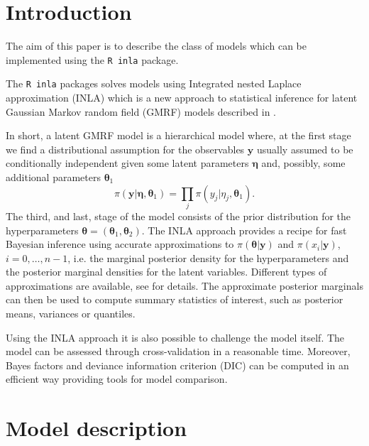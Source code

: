 \documentclass[a4paper,11pt]{article}
\def\mm#1{\ensuremath{\boldsymbol{#1}}} %
\begin{document}


\section{Introduction}

The aim of this paper is to describe the class of models which can be implemented using the {\tt R inla} package.

The {\tt R inla} packages solves models using 
Integrated nested Laplace approximation (INLA) which is a new approach to
statistical inference for latent Gaussian Markov random field (GMRF)
models described in  \cite{art451}. 

In short, a latent GMRF model is a hierarchical model where, at the
first stage we find a distributional assumption for the observables
$\mm{y}$ usually assumed to be conditionally independent given some
latent parameters $\mm{\eta}$ and, possibly, some additional
parameters $\mm{\theta}_1$
\[
\pi(\mm{y}|\mm{\eta},\mm{\theta}_1)=\prod_{j}\pi(y_j|\eta_j,\mm{\theta}_1).
\]
The third, and last, stage of the model consists of the prior
distribution for the hyperparameters
$\mm{\theta}=(\mm{\theta}_1,\mm{\theta}_2)$.
The INLA approach provides a recipe for fast Bayesian inference using
accurate approximations to $\pi(\mm{\theta}|\mm{y})$ and
$\pi(x_i|\mm{y})$, $i=0,\dots,n-1$, i.e. the marginal posterior
density for the hyperparameters and the posterior marginal densities
for the latent variables.  Different types of approximations are
available, see \cite{art451} for details. The approximate posterior
marginals can then be used to compute summary statistics of interest,
such as posterior means, variances or quantiles.

Using the INLA approach it is also possible to challenge the model
itself. The model can be assessed through cross-validation in a
reasonable time. Moreover, Bayes factors and deviance information
criterion (DIC) can be computed in an efficient way providing tools
for model comparison.

\section{Model description}
\end{document}

